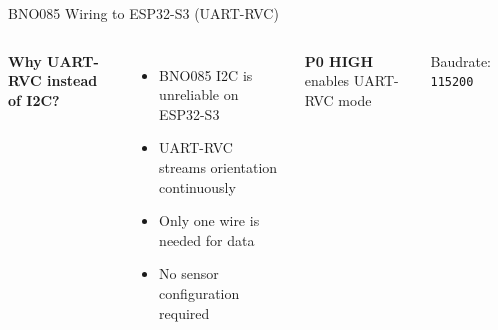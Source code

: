 \documentclass[aspectratio=169]{beamer}
\begin{document}
\begin{frame}{BNO085 Wiring to ESP32-S3 (UART-RVC)}

\begin{columns}[c,totalwidth=\textwidth]



\textbf{Why UART-RVC instead of I2C?}

\vspace{0.25cm}

\begin{itemize}\setlength\itemsep{0.55em}

\item BNO085 I2C is unreliable on ESP32-S3

\item UART-RVC streams orientation continuously

\item Only one wire is needed for data

\item No sensor configuration required

\end{itemize}

\vspace{0.35cm}

\small

{\color[rgb]{1.0,0.35,0.0}\textbf{P0 HIGH}}
enables UART-RVC mode

\vspace{0.08cm}

Baudrate: \texttt{115200}



\begin{center}

\end{center}
\end{columns}
\end{frame}
\end{document}
